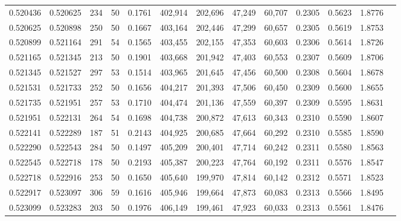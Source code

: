 \begin{tabular}{rrrrrrrrrrrrr}
0.520436 & 0.520625 &   234 &  50 &                                     0.1761 & 402,914 & 202,696 &  47,249 &  60,707 & 0.2305 & 0.5623 & 1.8776 \\
0.520625 & 0.520898 &   250 &  50 &                                     0.1667 & 403,164 & 202,446 &  47,299 &  60,657 & 0.2305 & 0.5619 & 1.8753 \\
0.520899 & 0.521164 &   291 &  54 &                                     0.1565 & 403,455 & 202,155 &  47,353 &  60,603 & 0.2306 & 0.5614 & 1.8726 \\
0.521165 & 0.521345 &   213 &  50 &                                     0.1901 & 403,668 & 201,942 &  47,403 &  60,553 & 0.2307 & 0.5609 & 1.8706 \\
0.521345 & 0.521527 &   297 &  53 &                                     0.1514 & 403,965 & 201,645 &  47,456 &  60,500 & 0.2308 & 0.5604 & 1.8678 \\
0.521531 & 0.521733 &   252 &  50 &                                     0.1656 & 404,217 & 201,393 &  47,506 &  60,450 & 0.2309 & 0.5600 & 1.8655 \\
0.521735 & 0.521951 &   257 &  53 &                                     0.1710 & 404,474 & 201,136 &  47,559 &  60,397 & 0.2309 & 0.5595 & 1.8631 \\
0.521951 & 0.522131 &   264 &  54 &                                     0.1698 & 404,738 & 200,872 &  47,613 &  60,343 & 0.2310 & 0.5590 & 1.8607 \\
0.522141 & 0.522289 &   187 &  51 &                                     0.2143 & 404,925 & 200,685 &  47,664 &  60,292 & 0.2310 & 0.5585 & 1.8590 \\
0.522290 & 0.522543 &   284 &  50 &                                     0.1497 & 405,209 & 200,401 &  47,714 &  60,242 & 0.2311 & 0.5580 & 1.8563 \\
0.522545 & 0.522718 &   178 &  50 &                                     0.2193 & 405,387 & 200,223 &  47,764 &  60,192 & 0.2311 & 0.5576 & 1.8547 \\
0.522718 & 0.522916 &   253 &  50 &                                     0.1650 & 405,640 & 199,970 &  47,814 &  60,142 & 0.2312 & 0.5571 & 1.8523 \\
0.522917 & 0.523097 &   306 &  59 &                                     0.1616 & 405,946 & 199,664 &  47,873 &  60,083 & 0.2313 & 0.5566 & 1.8495 \\
0.523099 & 0.523283 &   203 &  50 &                                     0.1976 & 406,149 & 199,461 &  47,923 &  60,033 & 0.2313 & 0.5561 & 1.8476 \\

\end{tabular}
